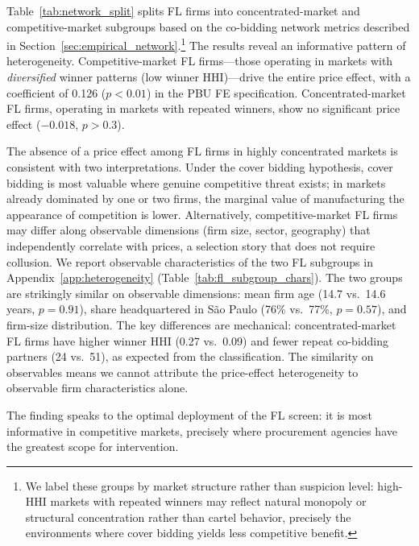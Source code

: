 Table~\ref{tab:network_split} splits FL firms into
concentrated-market and competitive-market subgroups based on the
co-bidding network metrics described in
Section~\ref{sec:empirical_network}.\footnote{We label these groups by
market structure rather than suspicion level: high-HHI markets with
repeated winners may reflect natural monopoly or structural concentration
rather than cartel behavior, precisely the environments where cover
bidding yields less competitive benefit.}
The results reveal an informative pattern of heterogeneity.
Competitive-market FL firms---those operating in markets with
\emph{diversified} winner patterns (low winner HHI)---drive the entire
price effect, with a coefficient of 0.126 ($p < 0.01$) in the PBU FE
specification. Concentrated-market FL firms, operating in markets with
repeated winners, show no significant price effect ($-0.018$, $p > 0.3$).

The absence of a price effect among FL firms in highly concentrated %
markets is consistent with two interpretations. Under the cover bidding
hypothesis, cover bidding is most valuable where genuine competitive
threat exists; in markets already dominated by one or two firms, the
marginal value of manufacturing the appearance of competition is
lower. Alternatively, competitive-market FL firms may differ along
observable dimensions (firm size, sector, geography) that independently
correlate with prices, a selection story that does not require
collusion. We report observable characteristics of the two FL subgroups
in Appendix~\ref{app:heterogeneity} (Table~\ref{tab:fl_subgroup_chars}).
The two groups are strikingly similar on observable dimensions: mean
firm age (14.7 vs.\ 14.6 years, $p = 0.91$), share headquartered in
S\~ao Paulo (76\% vs.\ 77\%, $p = 0.57$), and firm-size distribution.
The key differences are mechanical: concentrated-market FL firms have
higher winner HHI (0.27 vs.\ 0.09) and fewer repeat co-bidding partners
(24 vs.\ 51), as expected from the classification. The similarity on
observables means we cannot attribute the price-effect heterogeneity to
observable firm characteristics alone.

The finding speaks to the optimal deployment of the FL
screen: it is most informative in competitive markets, precisely where
procurement agencies have the greatest scope for intervention.

